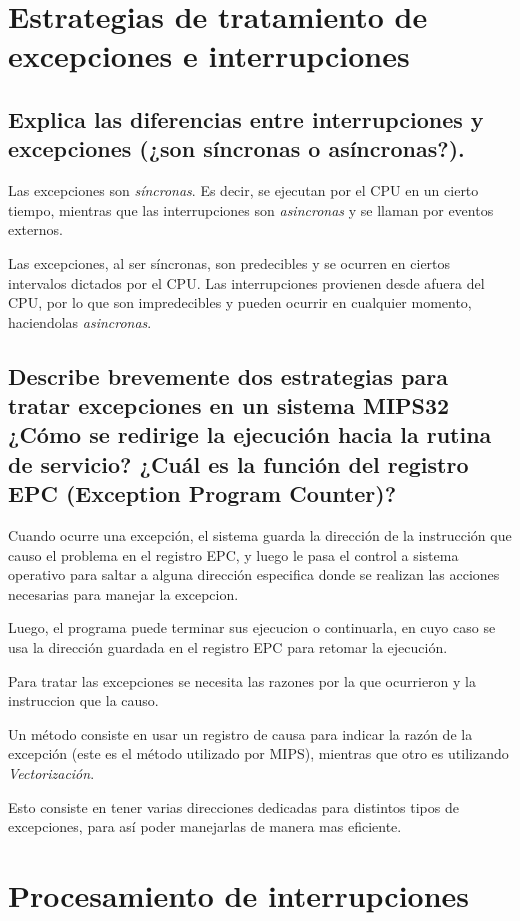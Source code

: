 \documentclass[titlepage]{article}
\begin{document}
\section*{Estrategias de tratamiento de excepciones e interrupciones}

\subsection*{Explica las diferencias entre interrupciones y excepciones (¿son síncronas o asíncronas?).}

Las excepciones son \emph{síncronas}. Es decir, se ejecutan por el CPU en un cierto tiempo, mientras que las interrupciones son \emph{asincronas} y se llaman por eventos externos.

Las excepciones, al ser síncronas, son predecibles y se ocurren en ciertos intervalos dictados por el CPU. Las interrupciones provienen desde afuera del CPU, por lo que son impredecibles y pueden ocurrir en cualquier momento, haciendolas \emph{asincronas}.

\subsection{Describe brevemente dos estrategias para tratar excepciones en un sistema MIPS32 ¿Cómo se redirige la ejecución hacia la rutina de servicio? ¿Cuál es la función del registro EPC (Exception Program Counter)?}

Cuando ocurre una excepción, el sistema guarda la dirección de la instrucción que causo el problema en el registro EPC, y luego le pasa el control a sistema operativo para saltar a alguna dirección especifica donde se realizan las acciones necesarias para manejar la excepcion.

Luego, el programa puede terminar sus ejecucion o continuarla, en cuyo caso se usa la dirección guardada en el registro EPC para retomar la ejecución.

Para tratar las excepciones se necesita las razones por la que ocurrieron y la instruccion que la causo.

Un método consiste en usar un registro de causa para indicar la razón de la excepción (este es el método utilizado por MIPS), mientras que otro es utilizando \emph{Vectorización}.

Esto consiste en tener varias direcciones dedicadas para distintos tipos de excepciones, para así poder manejarlas de manera mas eficiente.

\section*{Procesamiento de interrupciones}
\end{document}
